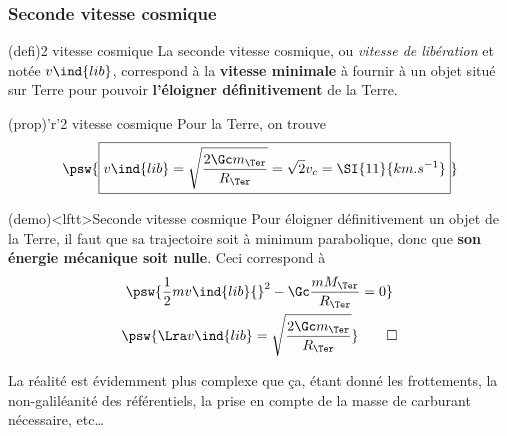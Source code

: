 \documentclass[../../main/main.tex]{subfiles}
\begin{document}
\subsubsection{Seconde vitesse cosmique}
\begin{tcbraster}[raster equal height=rows, raster columns=2]
	\begin{tcb*}(defi){2 vitesse cosmique}
		La seconde vitesse cosmique, ou \textit{vitesse de libération} et notée
		$v\ind{lib}$, correspond à la \textbf{vitesse minimale} à fournir à un objet
		situé sur Terre pour pouvoir \textbf{l'éloigner définitivement} de la Terre.
	\end{tcb*}
	\begin{tcb*}(prop)'r'{2 vitesse cosmique}
		Pour la Terre, on trouve
		\begin{gather*}
			\psw{
				\boxed{
					v\ind{lib} = \sqrt{\frac{2\Gc m_\Ter}{R_\Ter}} = \sqrt{2}v_c =
					\SI{11}{km.s^{-1}}
				}
			}
		\end{gather*}
	\end{tcb*}
\end{tcbraster}
\begin{tcb*}(demo)<lftt>{Seconde vitesse cosmique}
	Pour éloigner définitivement un objet de la Terre, il faut que sa trajectoire
	soit à minimum parabolique, donc que \textbf{son énergie mécanique soit
		nulle}. Ceci correspond à
	\begin{gather*}
		\psw{
			\frac{1}{2}mv\ind{lib}{}^2 -\Gc \frac{mM_\Ter}{R_\Ter} = 0
		}
		\\
		\psw{
			\Lra
			v\ind{lib} = \sqrt{\frac{2\Gc m_\Ter}{R_\Ter}}
		}
		\qed
	\end{gather*}
	\vspace{-15pt}
\end{tcb*}
La réalité est évidemment plus complexe que ça, étant donné les frottements, la
non-galiléanité des référentiels, la prise en compte de la masse de carburant
nécessaire, etc…
\end{document}
